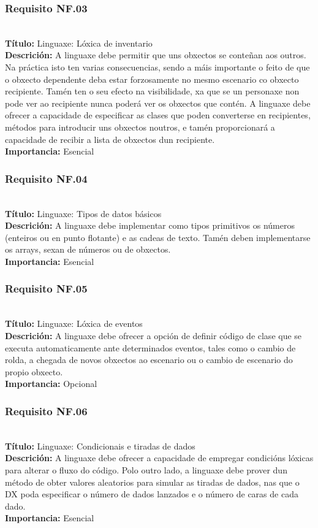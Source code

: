 \subsubsection{Requisito NF.03}~\\
{\bf Título:} Linguaxe: Lóxica de inventario\\
{\bf Descrición:} A linguaxe debe permitir que uns obxectos se conteñan aos
outros. Na práctica isto ten varias consecuencias, sendo a máis importante o
feito de que o obxecto dependente deba estar forzosamente no mesmo escenario co
obxecto recipiente. Tamén ten o seu efecto na visibilidade, xa que se un
personaxe non pode ver ao recipiente nunca poderá ver os obxectos que contén. A
linguaxe debe ofrecer a capacidade de especificar as clases que poden
converterse en recipientes, métodos para introducir uns obxectos noutros, e
tamén proporcionará a capacidade de recibir a lista de obxectos dun recipiente.\\
{\bf Importancia:} Esencial

\subsubsection{Requisito NF.04}~\\
{\bf Título:} Linguaxe: Tipos de datos básicos\\
{\bf Descrición:} A linguaxe debe implementar como tipos primitivos os números
(enteiros ou en punto flotante) e as cadeas de texto. Tamén deben implementarse
os arrays, sexan de números ou de obxectos.\\
{\bf Importancia:} Esencial

\subsubsection{Requisito NF.05}~\\
{\bf Título:} Linguaxe: Lóxica de eventos\\
{\bf Descrición:} A linguaxe debe ofrecer a opción de definir código de clase
que se executa automaticamente ante determinados eventos, tales como o cambio
de rolda, a chegada de novos obxectos ao escenario ou o cambio de escenario do
propio obxecto.\\
{\bf Importancia:} Opcional

\subsubsection{Requisito NF.06}~\\
{\bf Título:} Linguaxe: Condicionais e tiradas de dados\\
{\bf Descrición:} A linguaxe debe ofrecer a capacidade de empregar condicións
lóxicas para alterar o fluxo do código. Polo outro lado, a linguaxe debe prover
dun método de obter valores aleatorios para simular as tiradas de dados, nas
que o DX poda especificar o número de dados lanzados e o número de caras de
cada dado.\\
{\bf Importancia:} Esencial


